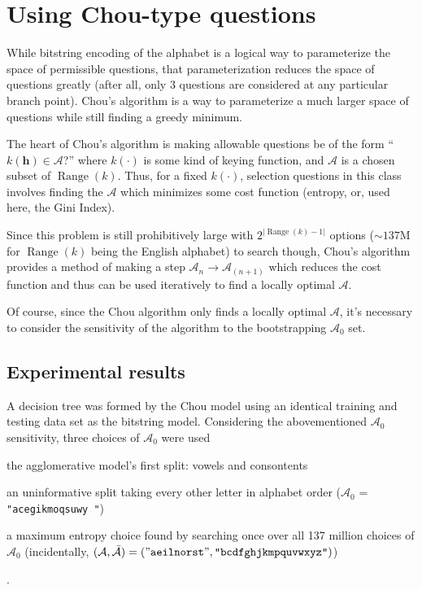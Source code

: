 \documentclass[12pt]{article}
\DeclareMathOperator*{\Range}{Range}
\begin{document}
\section{Using Chou-type questions}

While bitstring encoding of the alphabet is a logical way to
parameterize the space of permissible questions, that parameterization
reduces the space of questions greatly (after all, only 3 questions
are considered at any particular branch point). Chou's algorithm is a
way to parameterize a much larger space of questions while still
finding a greedy minimum.

The heart of Chou's algorithm is making allowable questions be of the
form ``$k(\mathbf{h}) \in \mathcal{A}$?'' where $k(\cdot)$ is some kind
of keying function, and $\mathcal{A}$ is a chosen subset of
$\Range(k)$. Thus, for a fixed $k(\cdot)$, selection questions in this
class involves finding the $\mathcal{A}$ which minimizes some cost
function (entropy, or, used here, the Gini Index).

Since this problem is still prohibitively large with
$2^{|\Range(k)-1|}$ options ($\sim 137$M for $\Range(k)$ being the
English alphabet) to search though, Chou's algorithm provides a method
of making a step $\mathcal{A}_{n} \to \mathcal{A}_{(n+1)}$ which
reduces the cost function and thus can be used iteratively to find a
locally optimal $\mathcal{A}$.

Of course, since the Chou algorithm only finds a locally optimal
$\mathcal{A}$, it's necessary to consider the sensitivity of the
algorithm to the bootstrapping $\mathcal{A}_0$ set.

\subsection{Experimental results}

A decision tree was formed by the Chou model using an identical
training and testing data set as the bitstring model. Considering the
abovementioned $\mathcal{A}_0$ sensitivity, three choices of
$\mathcal{A}_0$ were used \begin{inparaenum} 
\item the agglomerative model's first split: vowels and consontents
\item an uninformative split taking every other letter in alphabet
  order ($\mathcal{A}_0$ = \texttt{"acegikmoqsuwy "})
\item a maximum entropy choice found by searching once over all 137
  million choices of $\mathcal{A}_0$ (incidentally, $(\mathcal{A},
  \bar{\mathcal{A}}) = (\mathtt{"aeilnorst
    "},\texttt{"bcdfghjkmpquvwxyz"})$)
\end{inparaenum}. 
\end{document}

